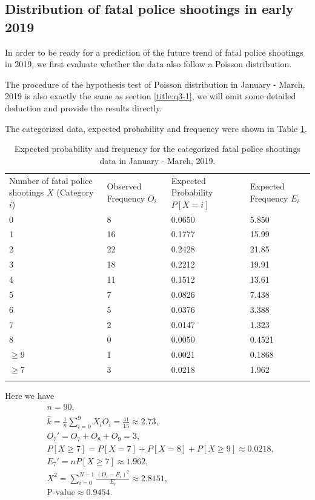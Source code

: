 \documentclass[conf]{new-aiaa}
\begin{document}
\subsection{Distribution of fatal police shootings in early 2019}

In order to be ready for a prediction of the future trend of fatal police shootings in 2019, we first evaluate whether the data also follow a Poisson distribution.\medskip

The procedure of the hypothesis test of Poisson distribution in January - March, 2019 is also exactly the same as section \ref{title:q3-1}, we will omit some detailed deduction and provide the results directly.\medskip

The categorized data, expected probability and frequency were shown in Table \ref{tab:q6}. \medskip

\begin{table}[!htbp]
\centering
\begin{tabular}{m{3cm}<{\centering}m{3cm}<{\centering}m{3cm}<{\centering}m{3cm}<{\centering}}
\toprule 
\toprule
Number of fatal police shootings $X$ (Category $i$)
 & Observed Frequency $O_i$ 
& Expected Probability $P[X=i]$ & Expected Frequency $E_i$ \\
\noalign{\smallskip}\hline\noalign{\smallskip}
0  &   8   & 0.0650  & 5.850\\
1  &   16   & 0.1777   & 15.99\\
2  &   22   & 0.2428   & 21.85\\
3  &   18   & 0.2212   & 19.91\\
4  &   11   & 0.1512   & 13.61\\
5  &   7   & 0.0826  & 7.438\\
6  &   5   & 0.0376  & 3.388\\
7  &   2    & 0.0147  & 1.323\\
8  &   0    & 0.0050  & 0.4521\\
$\geqslant$9  &   1    & 0.0021  & 0.1868\\\hline
$\geqslant$7  &   3    & 0.0218  & 1.962\\
\bottomrule 
\bottomrule  \smallskip
\end{tabular}
\caption{Expected probability and frequency for the categorized fatal police shootings data in January - March, 2019.}
\label{tab:q6}
\end{table}

Here we have
\begin{align*}
&n=90,\\
&\hat{k} = \frac{1}{n}\sum_{i=0}^{9} X_iO_i = \frac{41}{15} \approx 2.73,\\
&O_7'=O_7+O_8+O_9=3,\\
&P[X\geqslant7]=P[X=7]+P[X=8]+P[X\geqslant9]\approx 0.0218,\\
&E_7'=nP[X\geqslant7]\approx1.962,\\
&X^2=\sum_{i=0}^{N-1}\frac{(O_i-E_i)^2}{E_i}\approx2.8151,\\
&\text{P-value}\approx0.9454.
\end{align*}
\end{document}
